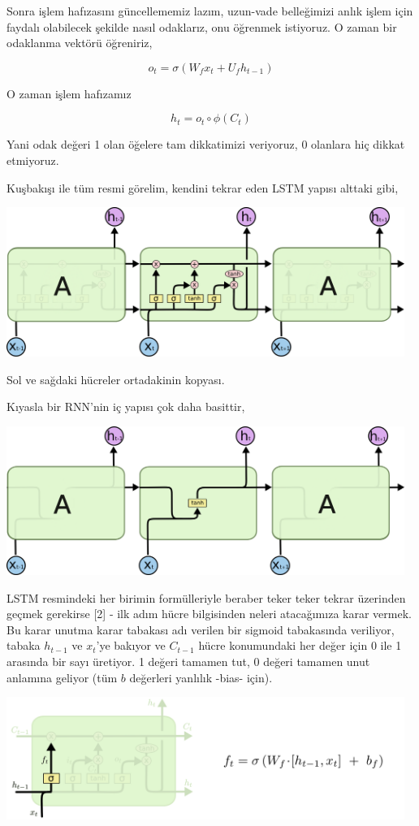 \documentclass[12pt,fleqn]{article}\usepackage{../../common}
\begin{document}
Sonra işlem hafızasını güncellememiz lazım, uzun-vade belleğimizi anlık
işlem için faydalı olabilecek şekilde nasıl odaklarız, onu öğrenmek
istiyoruz. O zaman bir odaklanma vektörü öğreniriz,

$$ o_t = \sigma (W_f x_t + U_f h_{t-1}) $$

O zaman işlem hafızamız

$$ h_t = o_t \circ \phi (C_t)$$

Yani odak değeri 1 olan öğelere tam dikkatimizi veriyoruz, 0 olanlara hiç
dikkat etmiyoruz. 

Kuşbakışı ile tüm resmi görelim, kendini tekrar eden LSTM yapısı alttaki gibi,

\includegraphics[width=35em]{lstm_02.png}

Sol ve sağdaki hücreler ortadakinin kopyası. 

Kıyasla bir RNN'nin iç yapısı çok daha basittir, 

\includegraphics[width=35em]{lstm_03.png}

LSTM resmindeki her birimin formülleriyle beraber teker teker tekrar
üzerinden geçmek gerekirse [2] - ilk adım hücre bilgisinden neleri
atacağımıza karar vermek. Bu karar unutma karar tabakası adı verilen bir
sigmoid tabakasında veriliyor, tabaka $h_{t-1}$ ve $x_t$'ye bakıyor ve
$C_{t-1}$ hücre konumundaki her değer için 0 ile 1 arasında bir sayı
üretiyor. 1 değeri tamamen tut, 0 değeri tamamen unut anlamına geliyor (tüm
$b$ değerleri yanlılık -bias- için).

\includegraphics[width=35em]{lstm_04.png}
\end{document}
